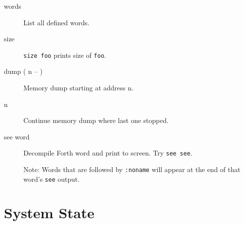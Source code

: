 \begin{description}
\item[words] List all defined words.
\item[size] \texttt{size foo} prints size of \texttt{foo}.
\item[dump ( n -- )] Memory dump starting at address n.
\item[n] Continue memory dump where last one stopped.
\item[see word] Decompile Forth word and print to screen. Try \texttt{see see}.

Note: Words that are followed by \texttt{:noname} will appear at the end of that word's \texttt{see} output.
\end{description}

\section{System State}

